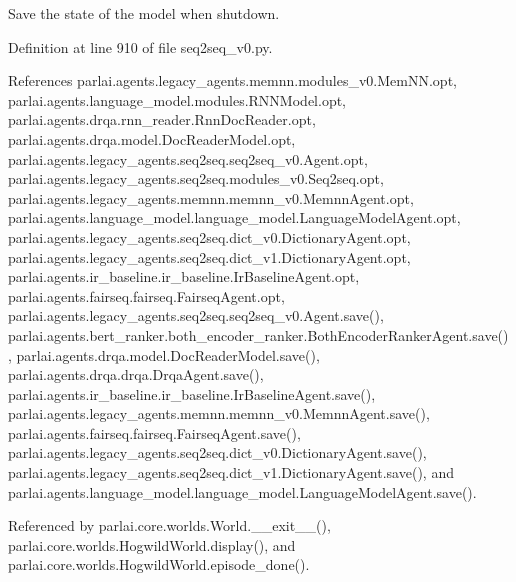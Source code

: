\begin{DoxyVerb}Save the state of the model when shutdown.\end{DoxyVerb}
 

Definition at line 910 of file seq2seq\+\_\+v0.\+py.



References parlai.\+agents.\+legacy\+\_\+agents.\+memnn.\+modules\+\_\+v0.\+Mem\+N\+N.\+opt, parlai.\+agents.\+language\+\_\+model.\+modules.\+R\+N\+N\+Model.\+opt, parlai.\+agents.\+drqa.\+rnn\+\_\+reader.\+Rnn\+Doc\+Reader.\+opt, parlai.\+agents.\+drqa.\+model.\+Doc\+Reader\+Model.\+opt, parlai.\+agents.\+legacy\+\_\+agents.\+seq2seq.\+seq2seq\+\_\+v0.\+Agent.\+opt, parlai.\+agents.\+legacy\+\_\+agents.\+seq2seq.\+modules\+\_\+v0.\+Seq2seq.\+opt, parlai.\+agents.\+legacy\+\_\+agents.\+memnn.\+memnn\+\_\+v0.\+Memnn\+Agent.\+opt, parlai.\+agents.\+language\+\_\+model.\+language\+\_\+model.\+Language\+Model\+Agent.\+opt, parlai.\+agents.\+legacy\+\_\+agents.\+seq2seq.\+dict\+\_\+v0.\+Dictionary\+Agent.\+opt, parlai.\+agents.\+legacy\+\_\+agents.\+seq2seq.\+dict\+\_\+v1.\+Dictionary\+Agent.\+opt, parlai.\+agents.\+ir\+\_\+baseline.\+ir\+\_\+baseline.\+Ir\+Baseline\+Agent.\+opt, parlai.\+agents.\+fairseq.\+fairseq.\+Fairseq\+Agent.\+opt, parlai.\+agents.\+legacy\+\_\+agents.\+seq2seq.\+seq2seq\+\_\+v0.\+Agent.\+save(), parlai.\+agents.\+bert\+\_\+ranker.\+both\+\_\+encoder\+\_\+ranker.\+Both\+Encoder\+Ranker\+Agent.\+save(), parlai.\+agents.\+drqa.\+model.\+Doc\+Reader\+Model.\+save(), parlai.\+agents.\+drqa.\+drqa.\+Drqa\+Agent.\+save(), parlai.\+agents.\+ir\+\_\+baseline.\+ir\+\_\+baseline.\+Ir\+Baseline\+Agent.\+save(), parlai.\+agents.\+legacy\+\_\+agents.\+memnn.\+memnn\+\_\+v0.\+Memnn\+Agent.\+save(), parlai.\+agents.\+fairseq.\+fairseq.\+Fairseq\+Agent.\+save(), parlai.\+agents.\+legacy\+\_\+agents.\+seq2seq.\+dict\+\_\+v0.\+Dictionary\+Agent.\+save(), parlai.\+agents.\+legacy\+\_\+agents.\+seq2seq.\+dict\+\_\+v1.\+Dictionary\+Agent.\+save(), and parlai.\+agents.\+language\+\_\+model.\+language\+\_\+model.\+Language\+Model\+Agent.\+save().



Referenced by parlai.\+core.\+worlds.\+World.\+\_\+\+\_\+exit\+\_\+\+\_\+(), parlai.\+core.\+worlds.\+Hogwild\+World.\+display(), and parlai.\+core.\+worlds.\+Hogwild\+World.\+episode\+\_\+done().


